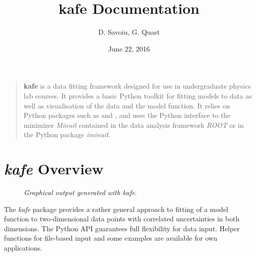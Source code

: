 \documentclass[a4paper,10pt,english]{sphinxmanual}
\title{kafe Documentation}
\date{June 22, 2016}
\author{D. Savoiu, G. Quast}
\begin{document}
\maketitle
\tableofcontents
{}\label{index_latex::doc}

\begin{quote}

\textbf{kafe} is a data fitting framework designed for use in undergraduate
physics lab courses. It provides a basic Python toolkit for fitting
models to data as well as visualisation of the data and the model function.
It relies on Python packages such as  and ,
and uses the Python interface to the minimizer \emph{Minuit} contained in the data
analysis framework \emph{ROOT} or in the Python package \emph{iminuit}.
\end{quote}


\chapter{\emph{kafe} Overview}
\label{overview:welcome-to-kafe-the-karlsruhe-fit-environment}\label{overview::doc}\label{overview:kafe-overview}\begin{figure}[htbp]\begin{flushright}
\capstart

\caption{\emph{Graphical output generated with kafe}.}\end{flushright}\end{figure}

The \emph{kafe} package provides a rather general approach to fitting of
a model function to two-dimensional data points with correlated uncertainties
in both dimensions. The Python API guarantees full flexibility
for data input. Helper functions for file-based input and some
examples are available for own applications.
\end{document}
